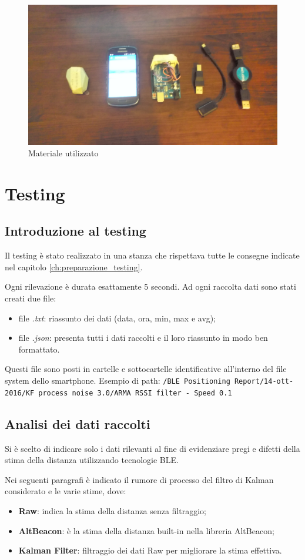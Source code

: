 \begin{figure}[ph]
	\centering
	\includegraphics[width=0.8\linewidth]{img/otg/otg3.jpg}
	\caption{Materiale utilizzato}
\end{figure}

\chapter{Testing}

\section{Introduzione al testing}
Il testing è stato realizzato in una stanza che rispettava tutte le consegne indicate nel capitolo \ref{ch:preparazione_testing}.

Ogni rilevazione è durata esattamente 5 secondi. Ad ogni raccolta dati sono stati creati due file:
\begin{itemize}
	\item file \textit{.txt}: riassunto dei dati (data, ora, min, max e avg);
	\item file \textit{.json}: presenta tutti i dati raccolti e il loro riassunto in modo ben formattato.
\end{itemize} 
Questi file sono posti in cartelle e sottocartelle identificative all'interno del file system dello smartphone. Esempio di path: \texttt{/BLE Positioning Report/14-ott-2016/KF process noise 3.0/ARMA RSSI filter - Speed 0.1}

\section{Analisi dei dati raccolti}
Si è scelto di indicare solo i dati rilevanti al fine di evidenziare pregi e difetti della stima della distanza utilizzando tecnologie BLE.

Nei seguenti paragrafi è indicato il rumore di processo del filtro di Kalman considerato e le varie stime, dove:
\begin{itemize}
	\item \textbf{Raw}: indica la stima della distanza senza filtraggio;
	\item \textbf{AltBeacon}: è la stima della distanza built-in nella libreria AltBeacon;
	\item \textbf{Kalman Filter}: filtraggio dei dati Raw per migliorare la stima effettiva.
\end{itemize}

